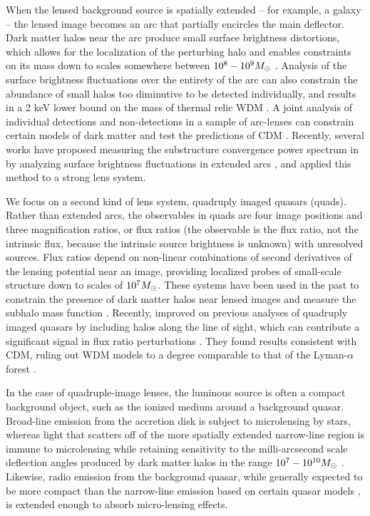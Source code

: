When the lensed background source is spatially extended -- for example, a galaxy -- the lensed image becomes an arc that partially encircles the main deflector. Dark matter halos near the arc produce small surface brightness distortions, which allows for the localization of the perturbing halo and enables constraints on its mass down to scales somewhere between $10^8 - 10^9 {M_{\odot}}$ \cite{Veg++14,Hezaveh++16}. Analysis of the surface brightness fluctuations over the entirety of the arc can also constrain the abundance of small halos too diminutive to be detected individually, and results in a 2 keV lower bound on the mass of thermal relic WDM \cite{Birrer++17a}. A joint analysis of individual detections and non-detections in a sample of arc-lenses can constrain certain models of dark matter and test the predictions of CDM \cite{Vegetti++18,Ritondale++18}. Recently, several works have proposed measuring the substructure convergence power spectrum in by analyzing surface brightness fluctuations in extended arcs \cite{Hezaveh++16b,Cyr-Racine++18,DiazRivero++18,Brennan++18}, and \cite{Bayer++18} applied this method to a strong lens system. 

We focus on a second kind of lens system, quadruply imaged quasars (quads). Rather than extended arcs, the observables in quads are four image positions and three magnification ratios, or flux ratios (the observable is the flux ratio, not the intrinsic flux, because the intrinsic source brightness is unknown) with unresolved sources. Flux ratios depend on non-linear combinations of second derivatives of the lensing potential near an image, providing localized probes of small-scale structure down to scales of $10^{7} {M_{\odot}}$. These systems have been used in the past to constrain the presence of dark matter halos near lensed images \cite{MetcalfMadau01,Metcalf++02,Amara++06,Nierenberg++14,Nierenberg++17} and measure the subhalo mass function \cite{D+K02}. Recently, \cite{Hsueh++19} improved on previous analyses of quadruply imaged quasars by including halos along the line of sight, which can contribute a significant signal in flux ratio perturbations \cite{Xu++12,Gilman++18}. They found results consistent with CDM, ruling out WDM models to a degree comparable to that of the Lyman-$\alpha$ forest \cite{Viel13,Irsic++17}. 

In the case of quadruple-image lenses, the luminous source is often a compact background object, such as the ionized medium around a background quasar. Broad-line emission from the accretion disk is subject to microlensing by stars, whereas light that scatters off of the more spatially extended narrow-line region is immune to microlensing while retaining sensitivity to the milli-arcsecond scale deflection angles produced by dark matter halos in the range $10^7 -10^{10}{M_{\odot}}$ \cite{MoustakasMetcalf02,Sugai++07,Nierenberg++14, Nierenberg++17}. Likewise, radio emission from the background quasar, while generally expected to be more compact than the narrow-line emission based on certain quasar models \cite{ElitzurSholsman06,Combes++19}, is extended enough to absorb micro-lensing effects. 

